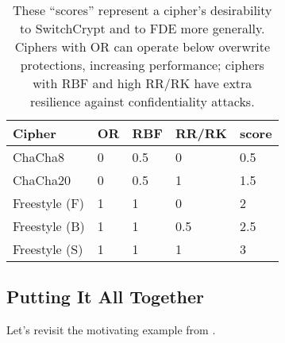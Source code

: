 \begin{table}[]
  \begin{tabular}{@{}lllll@{}}
  \toprule
  \textbf{Cipher} & \textbf{OR} & \textbf{RBF} & \textbf{RR/RK} & \textbf{score} \\ \midrule
  ChaCha8         & 0           & 0.5          & 0              & 0.5            \\
  ChaCha20        & 0           & 0.5          & 1              & 1.5            \\
  Freestyle (F)   & 1           & 1            & 0              & 2              \\
  Freestyle (B)   & 1           & 1            & 0.5            & 2.5            \\
  Freestyle (S)   & 1           & 1            & 1              & 3
  \end{tabular}
  \caption{These ``scores'' represent a cipher's desirability to SwitchCrypt and
  to FDE more generally. Ciphers with OR can operate below overwrite
  protections, increasing performance; ciphers with RBF and high RR/RK have
  extra resilience against confidentiality attacks.}
  \label{tbl:security-quant}
\end{table}

\subsection{Putting It All Together} \label{subsec:summary}

Let's revisit the motivating example from . 
